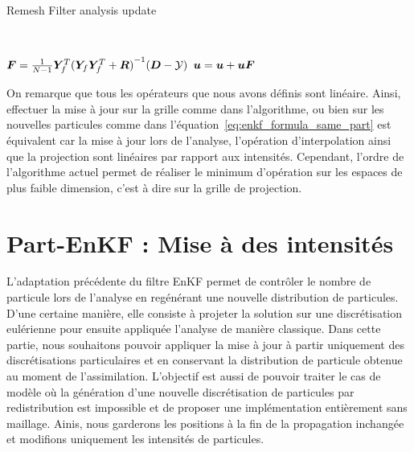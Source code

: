 \begin{algorithm}

    \caption{Remesh Filter analysis update}~\label{algo:remesh_enkf}


    $ \bm{F} = \frac{1}{N-1}\bm Y_f^T {(\bm Y_f \bm Y_f^T + \bm R)}^{-1}(\bm{D} - \mathcal{Y})$ 
    $\bm u = \bm u + \bm u \bm{F}$ 
\end{algorithm}


On remarque que tous les opérateurs que nous avons définis sont linéaire. Ainsi, effectuer la mise à jour sur la grille comme dans l'algorithme, ou bien sur les nouvelles particules comme dans l'équation~\eqref{eq:enkf_formula_same_part} est équivalent car la mise à jour lors de l'analyse, l'opération d'interpolation ainsi que la projection sont linéaires par rapport aux intensités.
Cependant, l'ordre de l'algorithme actuel permet de réaliser le minimum d'opération sur les espaces de plus faible dimension, c'est à dire sur la grille de projection.

\section{Part-EnKF : Mise à des intensités}

L'adaptation précédente du filtre EnKF permet de contrôler le nombre de particule lors de l'analyse en regénérant une nouvelle distribution de particules. D'une certaine manière, elle consiste à projeter la solution sur une discrétisation eulérienne pour ensuite appliquée l'analyse de manière classique.
Dans cette partie, nous souhaitons pouvoir appliquer la mise à jour à partir uniquement des discrétisations particulaires et en conservant la distribution de particule obtenue au moment de l'assimilation. L'objectif est aussi de pouvoir traiter le cas de modèle où la génération d'une nouvelle discrétisation de particules par redistribution est impossible et de proposer une implémentation entièrement sans maillage.
Ainis, nous garderons les positions à la fin de la propagation inchangée et modifions uniquement les intensités de particules.

